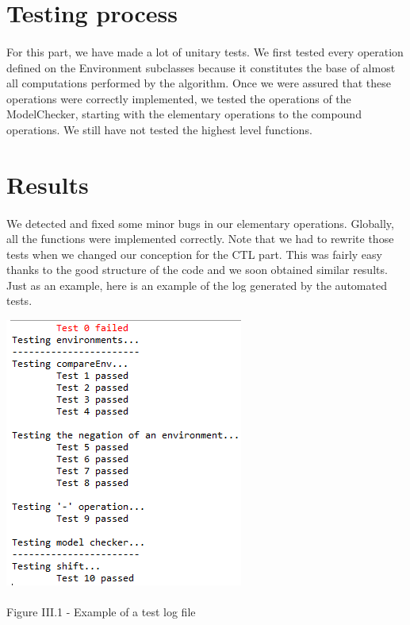 \documentclass{report}
\begin{document}
\section{Testing process}

\paragraph{}
\hspace{4mm}For this part, we have made a lot of unitary tests. We first tested every operation defined on the Environment subclasses
because it constitutes the base of almost all computations performed by the algorithm. Once we were assured that these operations were correctly implemented,
we tested the operations of the ModelChecker, starting with the elementary operations to the compound operations. We still have not tested
the highest level functions.

\section{Results}

\paragraph{}
\hspace{4mm}We detected and fixed some minor bugs in our elementary operations.  Globally, all the functions were implemented correctly.
Note that we had to rewrite those tests when we changed our conception for the CTL part. This was fairly easy thanks to the good structure of the code and we soon
obtained similar results. Just as an example, here is an example of the log generated by the automated tests.

\begin{center}
\includegraphics[scale=0.7]{data/test-log.png}
~\\~\\Figure III.1 - Example of a test log file
\end{center}
\end{document}
